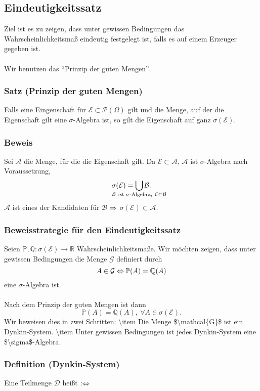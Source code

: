 \subsection{Eindeutigkeitssatz}
Ziel ist es zu zeigen, dass unter gewissen Bedingungen das Wahrscheinlichkeitsma\ss{} eindeutig festgelegt ist, falls es auf einem Erzeuger gegeben ist.
\\~\\
Wir benutzen das ``Prinzip der guten Mengen''.
\subsubsection{Satz (Prinzip der guten Mengen)}
Falls eine Eingenschaft f\"ur $\mathcal{E}\subset\mathcal{P}(\Omega)$ gilt und die Menge, auf der die Eigenschaft gilt eine $\sigma$-Algebra ist, so gilt die Eigenschaft auf ganz $\sigma(\mathcal{E})$.
\subsubsection{Beweis}
Sei $\mathcal{A}$ die Menge, f\"ur die die Eigenschaft gilt. Da $\mathcal{E}\subset\mathcal{A}$, $\mathcal{A}$ ist $\sigma$-Algebra nach Voraussetzung,
\[\sigma(\mathcal{E})=\bigcup_{\mathclap{\mathcal{B}\ \text{ist $\sigma$-Algebra},\ \mathcal{E}\subset\mathcal{B}}}\mathcal{B}.\]
$\mathcal{A}$ ist eines der Kandidaten f\"ur $\mathcal{B}$ $\Rightarrow$ $\sigma(\mathcal{E})\subset\mathcal{A}$.
\subsubsection{Beweisstrategie f\"ur den Eindeutigkeitssatz}
Seien $\mathbb{P},\mathbb{Q}\colon\sigma(\mathcal{E})\to\mathbb{R}$ Wahrscheinlichkeitsma\ss{}e. Wir m\"ochten zeigen, dass unter gewissen Bedingungen die Menge $\mathcal{G}$ definiert durch
\[A\in\mathcal{G}\Leftrightarrow\mathbb{P}(A)=\mathbb{Q}(A)\]
eine $\sigma$-Algebra ist.
\\~\\
Nach dem Prinzip der guten Mengen ist dann
\[\mathbb{P}(A)=\mathbb{Q}(A),\ \forall A\in\sigma(\mathcal{E}).\]
Wir beweisen dies in zwei Schritten:
\num{
\item Die Menge $\mathcal{G}$ ist ein Dynkin-System.
\item Unter gewissen Bedingungen ist jedes Dynkin-System eine $\sigma$-Algebra.
}
\subsubsection{Definition (Dynkin-System)}
Eine Teilmenge $\mathcal{D}$ hei\ss{}t  $:\Leftrightarrow$
